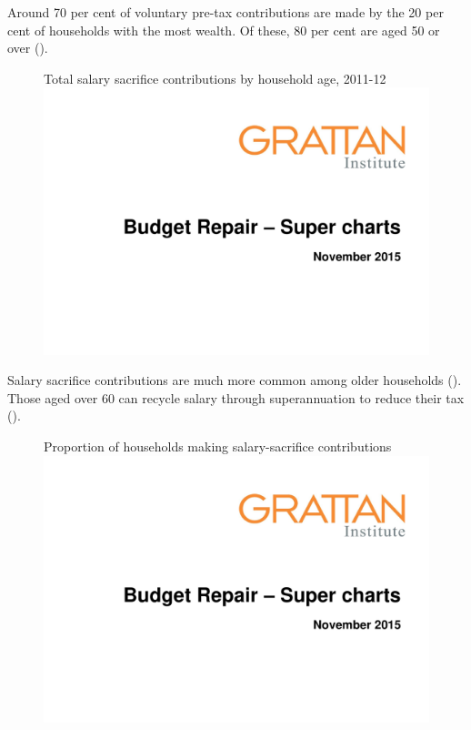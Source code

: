 \begin{subappendices}
\begin{figure}
\end{figure}

Around 70 per cent of voluntary pre-tax contributions are made by the 20 per cent of households with the most wealth. Of these, 80 per cent are aged 50 or over (). 

\begin{figure}
%
{Total salary sacrifice contributions by household age, 2011-12}\label{fig:SUPER-A-4}
\includegraphics[width=\columnwidth,page=38]{super-atlas/PPTX.pdf}

\end{figure}

Salary sacrifice contributions are much more common among older households (). Those aged over 60 can recycle salary through superannuation to reduce their tax ().

\begin{figure}
%
{Proportion of households making salary-sacrifice contributions}\label{fig:SUPER-A-5}
\includegraphics[width=\columnwidth,page=39]{super-atlas/PPTX.pdf}
\end{figure}


\end{subappendices}

